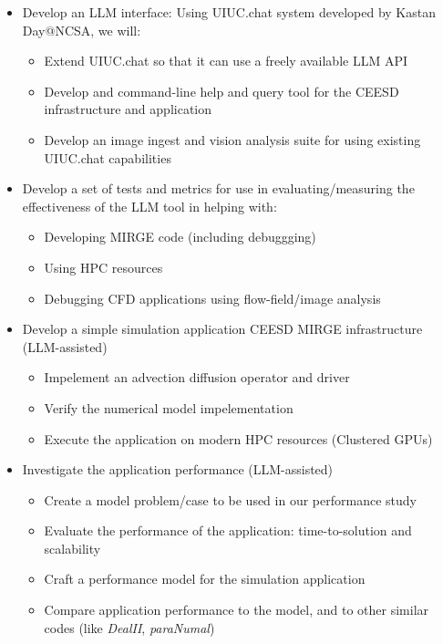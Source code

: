 \documentclass[11pt]{article}
\begin{document}
\begin{itemize}
\item Develop an LLM interface: Using UIUC.chat system developed by Kastan Day@NCSA, we will:
  \begin{itemize}
  \item Extend UIUC.chat so that it can use a freely available LLM API
  \item Develop and command-line help and query tool for the CEESD infrastructure and \ceesdcode{} application
  \item Develop an image ingest and vision analysis suite for \ceesdcode{} using existing UIUC.chat capabilities
  \end{itemize}
\item Develop a set of tests and metrics for use in evaluating/measuring the effectiveness of the LLM tool in helping with:
  \begin{itemize}
  \item Developing MIRGE code (including debuggging)
  \item Using HPC resources
  \item Debugging CFD applications using flow-field/image analysis
  \end{itemize}
\item Develop a simple simulation application CEESD MIRGE infrastructure (LLM-assisted)
  \begin{itemize}
  \item Impelement an advection diffusion operator and driver
  \item Verify the numerical model impelementation
  \item Execute the application on modern HPC resources (Clustered GPUs)
  \end{itemize}
\item Investigate the application performance (LLM-assisted)
  \begin{itemize}
  \item Create a model problem/case to be used in our performance study 
  \item Evaluate the performance of the application: time-to-solution and scalability
  \item Craft a performance model for the simulation application
  \item Compare application performance to the model, and to other similar codes (like \textit{DealII}, \textit{paraNumal})
  \end{itemize}
\end{itemize}
\end{document}
